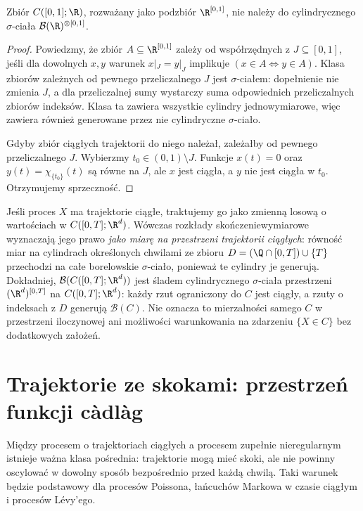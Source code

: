 \begin{stwierdzenie}
Zbiór $C([0,1];\R)$, rozważany jako podzbiór
$\R^{[0,1]}$, nie należy do cylindrycznego
$\sigma$-ciała $\mathcal B(\R)^{\otimes[0,1]}$.
\end{stwierdzenie}
\begin{proof}
Powiedzmy, że zbiór $A\subseteq\R^{[0,1]}$ zależy od
współrzędnych z $J\subseteq[0,1]$, jeśli dla dowolnych
$x,y$ warunek $x|_J=y|_J$ implikuje
$(x\in A\Longleftrightarrow y\in A)$.
Klasa zbiorów zależnych od pewnego przeliczalnego $J$
jest $\sigma$-ciałem: dopełnienie nie zmienia $J$,
a dla przeliczalnej sumy wystarczy suma odpowiednich
przeliczalnych zbiorów indeksów.
Klasa ta zawiera wszystkie cylindry jednowymiarowe,
więc zawiera również generowane przez nie
cylindryczne $\sigma$-ciało.

Gdyby zbiór ciągłych trajektorii do niego należał,
zależałby od pewnego przeliczalnego $J$.
Wybierzmy $t_0\in(0,1)\setminus J$. Funkcje
$x(t)=0$ oraz $y(t)=\chi_{\{t_0\}}(t)$ są równe na $J$,
ale $x$ jest ciągła, a $y$ nie jest ciągła w $t_0$.
Otrzymujemy sprzeczność.
\end{proof}

\begin{uwaga}
Jeśli proces $X$ ma trajektorie ciągłe, traktujemy go jako
zmienną losową o wartościach w $C([0,T];\R^d)$. Wówczas
rozkłady skończeniewymiarowe wyznaczają jego prawo
\emph{jako miarę na przestrzeni trajektorii ciągłych}:
równość miar na cylindrach określonych chwilami ze zbioru
$D=(\Q\cap[0,T])\cup\{T\}$ przechodzi na całe borelowskie
$\sigma$-ciało, ponieważ te cylindry je generują.
Dokładniej, $\mathcal B(C([0,T];\R^d))$ jest śladem
cylindrycznego $\sigma$-ciała przestrzeni $(\R^d)^{[0,T]}$
na $C([0,T];\R^d)$: każdy rzut ograniczony do $C$ jest
ciągły, a rzuty o indeksach z $D$ generują $\mathcal B(C)$.
Nie oznacza to mierzalności samego $C$ w przestrzeni
iloczynowej ani możliwości warunkowania na zdarzeniu
$\{X\in C\}$ bez dodatkowych założeń.
\end{uwaga}

\section{Trajektorie ze skokami: przestrzeń funkcji c\`adl\`ag}
Między procesem o trajektoriach ciągłych a procesem
zupełnie nieregularnym istnieje ważna klasa pośrednia:
trajektorie mogą mieć skoki, ale nie powinny oscylować
w dowolny sposób bezpośrednio przed każdą chwilą.
Taki warunek będzie podstawowy dla procesów Poissona,
łańcuchów Markowa w czasie ciągłym i procesów Lévy'ego.

